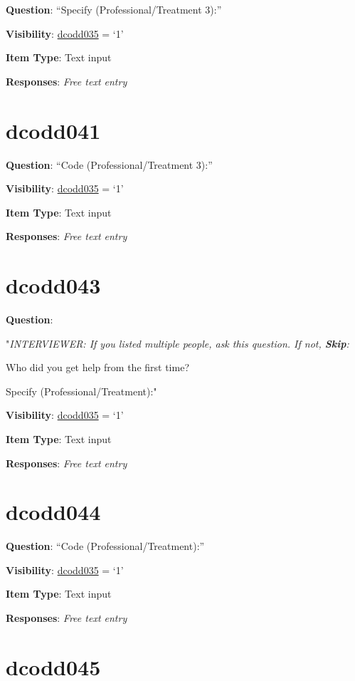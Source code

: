 \documentclass[]{book}
\begin{document}
\textbf{Question}: ``Specify (Professional/Treatment 3):''

\textbf{Visibility}: \protect\hyperlink{dcodd035}{dcodd035} = `1'

\textbf{Item Type}: Text input

\textbf{Responses}: \emph{Free text entry}

\hypertarget{dcodd041}{%
\section{dcodd041}\label{dcodd041}}

\textbf{Question}: ``Code (Professional/Treatment 3):''

\textbf{Visibility}: \protect\hyperlink{dcodd035}{dcodd035} = `1'

\textbf{Item Type}: Text input

\textbf{Responses}: \emph{Free text entry}

\hypertarget{dcodd043}{%
\section{dcodd043}\label{dcodd043}}

\textbf{Question}:

"\emph{INTERVIEWER: If you listed multiple people, ask this question. If not, \textbf{Skip}:}

Who did you get help from the first time?

Specify (Professional/Treatment):"

\textbf{Visibility}: \protect\hyperlink{dcodd035}{dcodd035} = `1'

\textbf{Item Type}: Text input

\textbf{Responses}: \emph{Free text entry}

\hypertarget{dcodd044}{%
\section{dcodd044}\label{dcodd044}}

\textbf{Question}: ``Code (Professional/Treatment):''

\textbf{Visibility}: \protect\hyperlink{dcodd035}{dcodd035} = `1'

\textbf{Item Type}: Text input

\textbf{Responses}: \emph{Free text entry}

\hypertarget{dcodd045}{%
\section{dcodd045}\label{dcodd045}}
\end{document}
